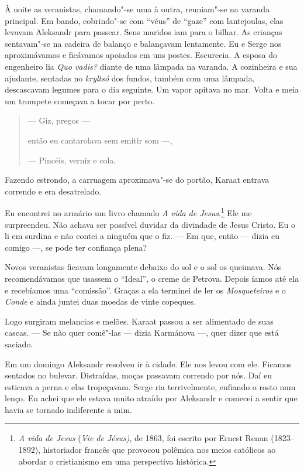 À noite as veranistas, chamando"-se uma à outra, reuniam"-se na varanda
principal. Em bando, cobrindo"-se com ``véus'' de ``gaze'' com
lantejoulas, elas levavam Aleksandr para passear. Seus maridos iam para
o bilhar. As crianças sentavam"-se na cadeira de balanço e balançavam
lentamente. Eu e Serge nos aproximávamos e ficávamos apoiados em uns
postes. Escurecia. A esposa do engenheiro lia \emph{Quo vadis?} diante
de uma lâmpada na varanda. A cozinheira e sua ajudante, sentadas no
\emph{kryltsó} dos fundos, também com uma lâmpada, descascavam legumes
para o dia seguinte. Um vapor apitava no mar. Volta e meia um trompete
começava a tocar por perto.

\begin{quotation}
--- Giz, pregos ---

então eu cantarolava sem emitir som ---,

--- Pincéis, verniz e cola.
\end{quotation}

Fazendo estrondo, a carruagem aproximava"-se do portão, Karaat entrava
correndo e era desatrelado.

Eu encontrei no armário um livro chamado \emph{A vida de
Jesus}.\footnote{\emph{A vida de Jesus} (\emph{Vie de Jésus)}, de 1863,
  foi escrito por Ernest Renan (1823--1892), historiador francês que
  provocou polêmica nos meios católicos ao abordar o cristianismo em
  uma perspectiva histórica.} Ele me surpreendeu. Não achava ser
possível duvidar da divindade de Jesus Cristo. Eu o li em surdina e não
contei a ninguém que o fiz. --- Em que, então --- dizia eu comigo ---,
se pode ter confiança plena?

Novos veranistas ficavam longamente debaixo do sol e o sol os queimava.
Nós recomendávamos que usassem o ``Ideal'', o creme de Petrova. Depois
íamos até ela e recebíamos uma ``comissão''. Graças a ela terminei de
ler os \emph{Mosqueteiros} e o \emph{Conde} e ainda juntei duas moedas
de vinte copeques.

Logo surgiram melancias e melões. Karaat passou a ser alimentado de suas
cascas. --- Se não quer comê"-las --- dizia Karmánova ---, quer dizer que
está saciado.

Em um domingo Aleksandr resolveu ir à cidade. Ele nos levou com ele.
Ficamos sentados no bulevar. Distraídas, moças passavam correndo por
nós. Daí eu esticava a perna e elas tropeçavam. Serge ria terrivelmente,
enfiando o rosto num lenço. Eu achei que ele estava muito atraído por
Aleksandr e comecei a sentir que havia se tornado indiferente a mim.

